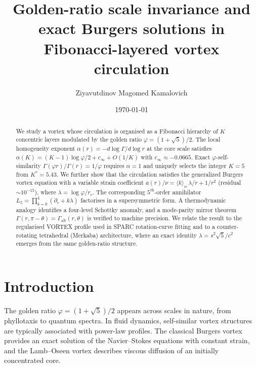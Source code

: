 \documentclass[twocolumn,aps,prfluids]{revtex4-2}
\newcommand{\phig}{\varphi}
\newcommand{\Gam}{\Gamma}
\begin{document}
\title{Golden-ratio scale invariance and exact Burgers solutions in
Fibonacci-layered vortex circulation}

\author{Ziyavutdinov Magomed Kamalovich}

\date{\today}

\begin{abstract}
We study a vortex whose circulation is organised as a Fibonacci hierarchy
of $K$ concentric layers modulated by the golden ratio $\phig = (1+\sqrt{5})/2$.
The local homogeneity exponent
$\alpha(r) = -d\log\Gam/d\log r$ at the core scale satisfies
$\alpha(K) = (K-1)\log\phig/2 + c_\infty + O(1/K)$ with
$c_\infty \approx -0.0665$. Exact $\phig$-self-similarity
$\Gam(\phig r)/\Gam(r) = 1/\phig$ requires $\alpha=1$ and uniquely selects
the integer $K=5$ from $K^*=5.43$. We further show that the circulation
satisfies the generalized Burgers vortex equation with a variable strain
coefficient $a(r)/\nu = \langle k\rangle_w\,\lambda/r + 1/r^2$ (residual
$\sim 10^{-15}$), where $\lambda = \log\phig/r_c$. The corresponding
$5^{\text{th}}$-order annihilator $L_5 = \prod_{k=0}^{4}(\partial_r + k\lambda)$
factorises in a supersymmetric form. A thermodynamic analogy identifies
a four-level Schottky anomaly, and a mode-parity mirror theorem
$\Gam(r,\pi-\theta) = \Gam_{\text{alt}}(r,\theta)$ is verified to machine
precision. We relate the result to the regularised VORTEX profile used in
SPARC rotation-curve fitting and to a counter-rotating tetrahedral
(Merkaba) architecture, where an exact identity $\lambda = s^2\sqrt{5}/c^2$
emerges from the same golden-ratio structure.
\end{abstract}

\maketitle

\section{Introduction}
\label{sec:intro}

The golden ratio $\phig = (1+\sqrt{5})/2$ appears across scales in nature,
from phyllotaxis to quantum spectra. In fluid dynamics, self-similar vortex
structures are typically associated with power-law profiles. The classical
Burgers vortex provides an exact solution of the Navier--Stokes equations
with constant strain, and the Lamb--Oseen vortex describes viscous diffusion
of an initially concentrated core.
\end{document}
